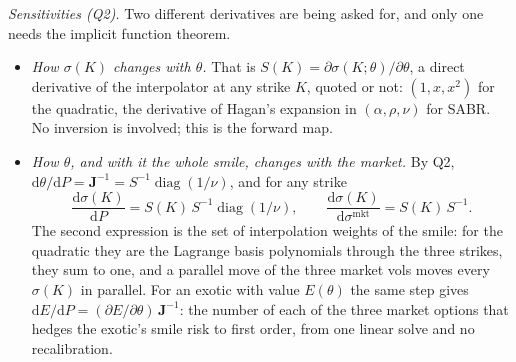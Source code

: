 \documentclass[11pt]{article}
\newcommand{\J}{\mathbf{J}}
\newcommand{\dd}{\mathrm{d}}
\DeclareMathOperator{\diag}{diag}
\begin{document}
\emph{Sensitivities (Q2).} Two different derivatives are being asked for, and only one needs the implicit function theorem.
\begin{itemize}[leftmargin=*]
\item \emph{How $\sigma(K)$ changes with $\theta$.} That is $S(K)=\partial\sigma(K;\theta)/\partial\theta$, a direct derivative of the interpolator at any strike $K$, quoted or not: $(1,x,x^2)$ for the quadratic, the derivative of Hagan's expansion in $(\alpha,\rho,\nu)$ for SABR. No inversion is involved; this is the forward map.
\item \emph{How $\theta$, and with it the whole smile, changes with the market.} By Q2, $\dd\theta/\dd P=\J^{-1}=S^{-1}\diag(1/\nu)$, and for any strike
\[
\frac{\dd\sigma(K)}{\dd P}=S(K)\,S^{-1}\diag(1/\nu),
\qquad
\frac{\dd\sigma(K)}{\dd\sigma^{\mathrm{mkt}}}=S(K)\,S^{-1}.
\]
The second expression is the set of interpolation weights of the smile: for the quadratic they are the Lagrange basis polynomials through the three strikes, they sum to one, and a parallel move of the three market vols moves every $\sigma(K)$ in parallel. For an exotic with value $E(\theta)$ the same step gives $\dd E/\dd P=(\partial E/\partial\theta)\,\J^{-1}$: the number of each of the three market options that hedges the exotic's smile risk to first order, from one linear solve and no recalibration.
\end{itemize}
\end{document}
